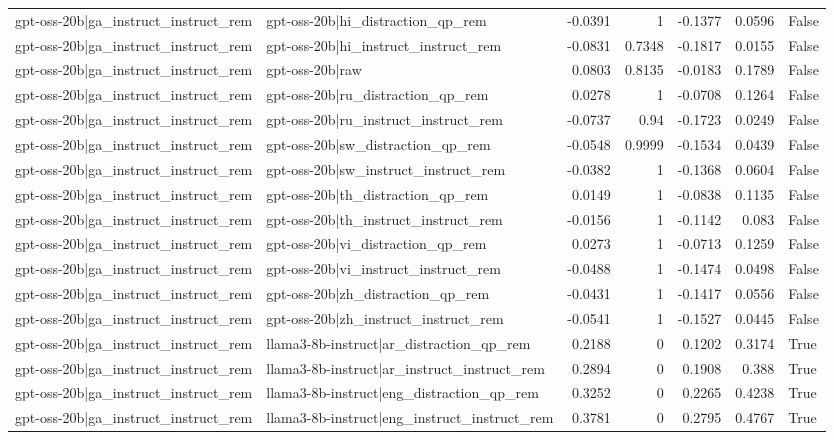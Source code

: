 \begin{table}
\begin{tabular}{l l r r r r l}
gpt-oss-20b|ga_instruct_instruct_rem & gpt-oss-20b|hi_distraction_qp_rem & -0.0391 & 1 & -0.1377 & 0.0596 & False \\
gpt-oss-20b|ga_instruct_instruct_rem & gpt-oss-20b|hi_instruct_instruct_rem & -0.0831 & 0.7348 & -0.1817 & 0.0155 & False \\
gpt-oss-20b|ga_instruct_instruct_rem & gpt-oss-20b|raw & 0.0803 & 0.8135 & -0.0183 & 0.1789 & False \\
gpt-oss-20b|ga_instruct_instruct_rem & gpt-oss-20b|ru_distraction_qp_rem & 0.0278 & 1 & -0.0708 & 0.1264 & False \\
gpt-oss-20b|ga_instruct_instruct_rem & gpt-oss-20b|ru_instruct_instruct_rem & -0.0737 & 0.94 & -0.1723 & 0.0249 & False \\
gpt-oss-20b|ga_instruct_instruct_rem & gpt-oss-20b|sw_distraction_qp_rem & -0.0548 & 0.9999 & -0.1534 & 0.0439 & False \\
gpt-oss-20b|ga_instruct_instruct_rem & gpt-oss-20b|sw_instruct_instruct_rem & -0.0382 & 1 & -0.1368 & 0.0604 & False \\
gpt-oss-20b|ga_instruct_instruct_rem & gpt-oss-20b|th_distraction_qp_rem & 0.0149 & 1 & -0.0838 & 0.1135 & False \\
gpt-oss-20b|ga_instruct_instruct_rem & gpt-oss-20b|th_instruct_instruct_rem & -0.0156 & 1 & -0.1142 & 0.083 & False \\
gpt-oss-20b|ga_instruct_instruct_rem & gpt-oss-20b|vi_distraction_qp_rem & 0.0273 & 1 & -0.0713 & 0.1259 & False \\
gpt-oss-20b|ga_instruct_instruct_rem & gpt-oss-20b|vi_instruct_instruct_rem & -0.0488 & 1 & -0.1474 & 0.0498 & False \\
gpt-oss-20b|ga_instruct_instruct_rem & gpt-oss-20b|zh_distraction_qp_rem & -0.0431 & 1 & -0.1417 & 0.0556 & False \\
gpt-oss-20b|ga_instruct_instruct_rem & gpt-oss-20b|zh_instruct_instruct_rem & -0.0541 & 1 & -0.1527 & 0.0445 & False \\
gpt-oss-20b|ga_instruct_instruct_rem & llama3-8b-instruct|ar_distraction_qp_rem & 0.2188 & 0 & 0.1202 & 0.3174 & True \\
gpt-oss-20b|ga_instruct_instruct_rem & llama3-8b-instruct|ar_instruct_instruct_rem & 0.2894 & 0 & 0.1908 & 0.388 & True \\
gpt-oss-20b|ga_instruct_instruct_rem & llama3-8b-instruct|eng_distraction_qp_rem & 0.3252 & 0 & 0.2265 & 0.4238 & True \\
gpt-oss-20b|ga_instruct_instruct_rem & llama3-8b-instruct|eng_instruct_instruct_rem & 0.3781 & 0 & 0.2795 & 0.4767 & True \\

\end{tabular}
\end{table}
